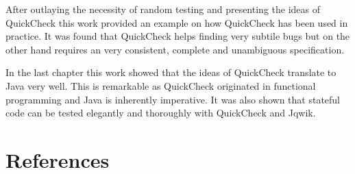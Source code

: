 \documentclass[a4paper, 12pt]{article} %
\begin{document}

After outlaying the necessity of random testing and presenting the ideas of QuickCheck this work provided an example on how QuickCheck has been used in practice. It was found that QuickCheck helps finding very subtile bugs but on the other hand requires an very consistent, complete and unambiguous specification. 


In the last chapter this work showed that the ideas of QuickCheck translate to Java very well. This is remarkable as QuickCheck originated in functional programming and Java is inherently imperative. It was also shown that stateful code can be tested elegantly and thoroughly with QuickCheck and Jqwik. 





\newpage
\section{References}
\printbibliography[heading=none]
\end{document}
